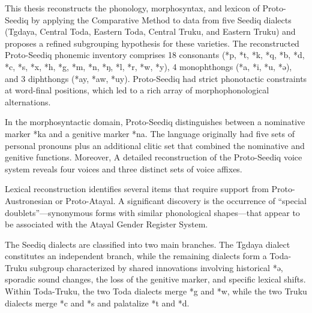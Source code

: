 \vspace{-1.15cm}
This thesis reconstructs the phonology, morphosyntax, and lexicon of Proto-Seediq by applying the Comparative Method to data from five Seediq dialects (Tgdaya, Central Toda, Eastern Toda, Central Truku, and Eastern Truku) and proposes a refined subgrouping hypothesis for these varieties. The reconstructed Proto-Seediq phonemic inventory comprises 18 consonants (*p, *t, *k, *q, *b, *d, *c, *s, *x, *h, *g, *m, *n, *ŋ, *l, *r, *w, *y), 4 monophthongs (*a, *i, *u, *ə), and 3 diphthongs (*ay, *aw, *uy). Proto-Seediq had strict phonotactic constraints at word-final positions, which led to a rich array of morphophonological alternations.

In the morphosyntactic domain, Proto-Seediq distinguishes between a nominative marker *ka and a genitive marker *na. The language originally had five sets of personal pronouns plus an additional clitic set that combined the nominative and genitive functions. Moreover, A detailed reconstruction of the Proto-Seediq voice system reveals four voices and three distinct sets of voice affixes.

Lexical reconstruction identifies several items that require support from Proto-Austronesian or Proto-Atayal. A significant discovery is the occurrence of ``special doublets''—synonymous forms with similar phonological shapes—that appear to be associated with the Atayal Gender Register System. 

The Seediq dialects are classified into two main branches. The Tgdaya dialect constitutes an independent branch, while the remaining dialects form a Toda-Truku subgroup characterized by shared innovations involving historical *ə, sporadic sound changes, the loss of the genitive marker, and specific lexical shifts. Within Toda-Truku, the two Toda dialects merge *g and *w, while the two Truku dialects merge *c and *s and palatalize *t and *d.








